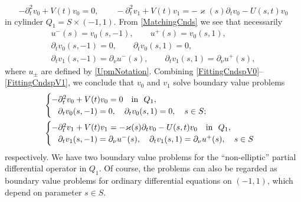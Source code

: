 \documentclass[reqno]{amsart}
\theoremstyle{plain}
\numberwithin{equation}{section}
\renewcommand{\kappa}{\varkappa}
\newcommand{\pte}{\partial_t}
\begin{document}
\begin{equation}\label{EqnsV0V1}
-\pte^2 v_0+V(t)v_0=0,
\qquad
-\pte^2 v_1+V(t)v_1=-\kappa(s)\pte v_0-U(s,t)v_0
\end{equation}
in cylinder $Q_1=S\times(-1,1)$.
From \eqref{MatchingCnds} we see that necessarily
\begin{gather}\label{FittingCndsUV0}
 u^-(s)=v_0(s,-1),\qquad u^+(s)=v_0(s,1),
 \\\label{FittingCndspV0}
 \partial_t v_0(s,- 1)=0, \qquad \partial_t v_0(s, 1)=0, \\\label{FittingCndspV1}
 \partial_t v_1(s, -1)=\partial_\nu u^-(s), \qquad
 \partial_t v_1(s, 1)=\partial_\nu u^+(s),
\end{gather}
where $u_\pm$ are defined by \eqref{UpmNotation}.
Combining \eqref{FittingCndspV0}--\eqref{FittingCndspV1}, we conclude that $v_0$ and $v_1$ solve boundary value problems
\begin{align}\label{problemV0}
&\begin{cases}
  -\pte^2 v_0+V(t)v_0=0 \quad \hbox{in \ } Q_1, \\
    \phantom{-}\partial_t v_0(s,- 1)=0, \quad \partial_t v_0(s, 1)=0, \quad s\in S;
\end{cases}
\\\label{problemV1}
&\begin{cases}
  -\pte^2 v_1+V(t)v_1=-\kappa(s)\pte v_0-U(s,t)v_0\quad \hbox{in \ } Q_1, \\
    \phantom{-}\partial_t v_1(s, -1)=\partial_\nu u^-(s), \quad
\partial_t v_1(s, 1)=\partial_\nu u^+(s), \quad s\in S
\end{cases}
\end{align}
respectively.
We have two boundary value problems for the ``non-ellip\-tic'' partial differential operator in $Q_1$. Of course,  the problems can also be  regarded as  boundary value problems for ordinary differential equations on $(-1,1)$, which depend on parameter $s\in S$.
\end{document}
